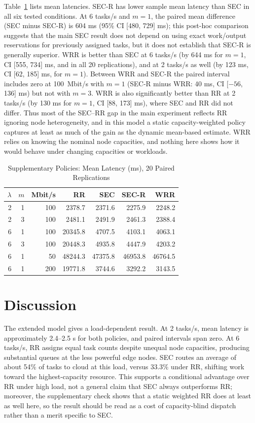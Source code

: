 \documentclass[conference]{IEEEtran}
\begin{document}
Table~\ref{tab:supp} lists mean latencies. SEC-R has lower sample mean latency than SEC in all six tested conditions. At 6 tasks/s and $m=1$, the paired mean difference (SEC minus SEC-R) is 604 ms (95\% CI [480, 729] ms); this post-hoc comparison suggests that the main SEC result does not depend on using exact work/output reservations for previously assigned tasks, but it does not establish that SEC-R is generally superior. WRR is better than SEC at 6 tasks/s (by 644 ms for $m=1$, CI [555, 734] ms, and in all 20 replications), and at 2 tasks/s as well (by 123 ms, CI [62, 185] ms, for $m=1$). Between WRR and SEC-R the paired interval includes zero at 100~Mbit/s with $m=1$ (SEC-R minus WRR: 40 ms, CI [$-56$, 136] ms) but not with $m=3$. WRR is also significantly better than RR at 2 tasks/s (by 130 ms for $m=1$, CI [88, 173] ms), where SEC and RR did not differ. Thus most of the SEC--RR gap in the main experiment reflects RR ignoring node heterogeneity, and in this model a static capacity-weighted policy captures at least as much of the gain as the dynamic mean-based estimate. WRR relies on knowing the nominal node capacities, and nothing here shows how it would behave under changing capacities or workloads.

\begin{table}[t]
\caption{Supplementary Policies: Mean Latency (ms), 20 Paired Replications}
\label{tab:supp}
\centering
\footnotesize
\begin{tabular}{rrrrrrr}
\toprule
$\lambda$ & $m$ & Mbit/s & RR & SEC & SEC-R & WRR\\
\midrule
2 & 1 & 100 & 2378.7 & 2371.6 & 2275.9 & 2248.2\\
2 & 3 & 100 & 2481.1 & 2491.9 & 2461.3 & 2388.4\\
6 & 1 & 100 & 20345.8 & 4707.5 & 4103.1 & 4063.1\\
6 & 3 & 100 & 20448.3 & 4935.8 & 4447.9 & 4203.2\\
6 & 1 & 50 & 48244.3 & 47375.8 & 46953.8 & 46764.5\\
6 & 1 & 200 & 19771.8 & 3744.6 & 3292.2 & 3143.5\\
\bottomrule
\end{tabular}
\end{table}

\section{Discussion}
\label{sec:disc}
The extended model gives a load-dependent result. At 2 tasks/s, mean latency is approximately 2.4--2.5 s for both policies, and paired intervals span zero. At 6 tasks/s, RR assigns equal task counts despite unequal node capacities, producing substantial queues at the less powerful edge nodes. SEC routes an average of about 54\% of tasks to cloud at this load, versus 33.3\% under RR, shifting work toward the highest-capacity resource. This supports a conditional advantage over RR under high load, not a general claim that SEC always outperforms RR; moreover, the supplementary check shows that a static weighted RR does at least as well here, so the result should be read as a cost of capacity-blind dispatch rather than a merit specific to SEC.
\end{document}
